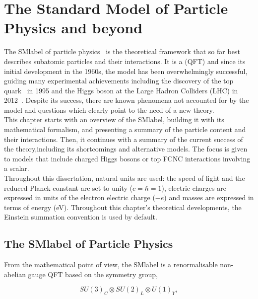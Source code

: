 \chapter{The Standard Model of Particle Physics and beyond}
\label{chapter:SM}

The \acrfull{SMlabel} of particle physics~\cite{PhysRevLett.19.1264,GLASHOW1961579,RevModPhys.52.525} is the theoretical framework
that so far best describes subatomic particles and their interactions.
It is a  (\acrshort{QFT}) and since its initial development in the 1960s,
the model has been overwhelmingly successful, guiding many experimental achievements
including the discovery of the top quark~\cite{topsearch1995,PhysRevLett.74.2626} in 1995
and the Higgs boson at the Large Hadron Colliders (LHC) in 2012~\cite{ATLASHiggs2012,CMShiggs2012}.
Despite its success, there are known phenomena not accounted for by the model
and questions which clearly point to the need of a new theory.\\

This chapter starts with an overview of the \acrshort{SMlabel}, building it with its mathematical formalism, and presenting a summary of the particle content and their interactions. Then, it continues with a summary of the current success of the theory,including its shortcomings and alternative models. The focus is given to models that include charged Higgs bosons or top FCNC interactions involving a scalar.\\

Throughout this dissertation, natural units are used: the speed of light and the reduced Planck constant are set to unity ($c=\hbar=1$),
electric charges are expressed in units of the electron electric charge ($-e$) and masses are expressed in terms of energy (eV). Throughout this chapter's theoretical developments, the Einstein summation convention is used by default.

\section{The \acrlong{SMlabel} of Particle Physics}

From the mathematical point of view, the \acrshort{SMlabel} is a renormalisable non-abelian gauge \acrshort{QFT} based on the
symmetry group, 

\begin{equation}
    \label{Theory_eq:SMgroup}
    SU(3)_C\otimes SU(2)_L\otimes U(1)_Y,
\end{equation}

